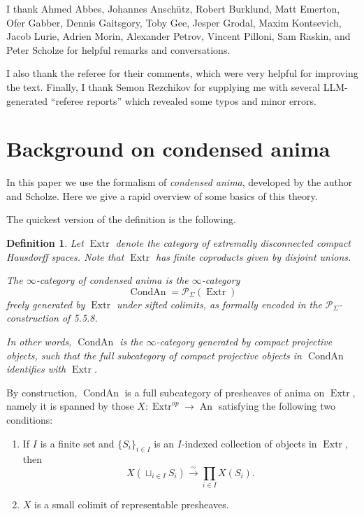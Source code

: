 \documentclass[12pt]{article}
\newtheorem{definition}[theorem]{Definition}
\theoremstyle{definition}
\newcommand{\on}{\operatorname}
\newcommand{\mc}{\mathcal}
\begin{document}
I thank Ahmed Abbes, Johannes Ansch\"utz, Robert Burklund, Matt Emerton, Ofer Gabber, Dennis Gaitsgory, Toby Gee, Jesper Grodal, Maxim Kontsevich, Jacob Lurie, Adrien Morin, Alexander Petrov, Vincent Pilloni, Sam Raskin, and Peter Scholze for helpful remarks and conversations.

I also thank the referee for their comments, which were very helpful for improving the text.  Finally, I thank Semon Rezchikov for supplying me with several LLM-generated ``referee reports'' which revealed some typos and minor errors.

\section{Background on condensed anima}\label{condback}

In this paper we use the formalism of \emph{condensed anima}, developed by the author and Scholze.  Here we give a rapid overview of some basics of this theory.

The quickest version of the definition is the following.

\begin{definition}
Let $\on{Extr}$ denote the category of extremally disconnected compact Hausdorff spaces.  Note that $\on{Extr}$ has finite coproducts given by disjoint unions.

The $\infty$-category of \emph{condensed anima} is the $\infty$-category
$$\on{CondAn} = \mc{P}_{\Sigma}(\on{Extr})$$
freely generated by $\on{Extr}$ under sifted colimits, as formally encoded in the $\mc{P}_{\Sigma}$-construction of \cite{htt} 5.5.8.

In other words, $\on{CondAn}$ is the $\infty$-category generated by compact projective objects, such that the full subcategory of compact projective objects in $\on{CondAn}$ identifies with $\on{Extr}$.
\end{definition}

By construction, $\on{CondAn}$ is a full subcategory of presheaves of anima on $\on{Extr}$, namely it is spanned by those $X:\on{Extr}^{op} \to \on{An}$ satisfying the following two conditions:
\begin{enumerate}
\item If $I$ is a finite set and $\{S_i\}_{i\in I}$ is an $I$-indexed collection of objects in $\on{Extr}$, then
$$X(\sqcup_{i\in I} S_i) \overset{\sim}{\rightarrow} \prod_{i\in I} X(S_i).$$
\item $X$ is a small colimit of representable presheaves.
\end{enumerate}
\end{document}

